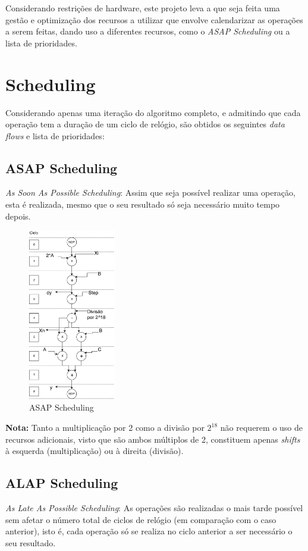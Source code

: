 \documentclass{article} %
\begin{document}
		\noindent Considerando restrições de hardware, este projeto leva a que seja feita uma gestão e optimização dos recursos a utilizar que envolve calendarizar as operações a serem feitas, dando uso a diferentes recursos, como o \emph{ASAP Scheduling} ou a lista de prioridades.

	\section{Scheduling}
		Considerando apenas uma iteração do algoritmo completo, e admitindo que cada operação tem a duração de um ciclo de relógio, são obtidos os seguintes \emph{data flows} e lista de prioridades:

		\subsection{ASAP Scheduling}
			\emph{As Soon As Possible Scheduling}: Assim que seja possível realizar uma operação, esta é realizada, mesmo que o seu resultado só seja necessário muito tempo depois.


			\begin{figure}[ht]
				\begin{center}
					\includegraphics[width=1.5in]{ASAP.pdf}
					\caption{ASAP Scheduling}
					\label{fig:ASAP}
				\end{center}
			\end{figure}
			
			\textbf{Nota:} Tanto a multiplicação por 2 como a divisão por $2^{18}$ não requerem o uso de recursos adicionais, visto que são ambos múltiplos de 2, constituem apenas \emph{shifts} à esquerda (multiplicação) ou à direita (divisão). 

		\clearpage

		\subsection{ALAP Scheduling}
			\emph{As Late As Possible Scheduling}: As operações são realizadas o mais tarde possível sem afetar o número total de ciclos de relógio (em comparação com o caso anterior), isto é, cada operação só se realiza no ciclo anterior a ser necessário o seu resultado.\\
\end{document}
